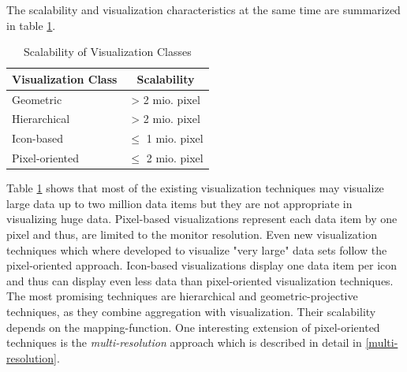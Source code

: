 
The scalability and visualization characteristics at the same time are summarized in table \ref{table:vizScalabilityOverview}. 

\begin{table}[H]
	\centering
	\caption[Scalability of Visualization Classes]{Scalability of Visualization Classes}
	\label{table:vizScalabilityOverview}
	\begin{tabular}{ l | c }
	\hline
	Visualization Class & Scalability\\
	\hline
	Geometric &  \cellcolor{green!25 } > 2 mio. pixel\\
	Hierarchical & \cellcolor{green!25} > 2 mio. pixel \\
	Icon-based & \cellcolor{red!25} $\leq$ 1 mio. pixel \\
	Pixel-oriented & \cellcolor{yellow!25} $\leq$ 2 mio. pixel \\	
	\hline
	\end{tabular}
\end{table}

Table \ref{table:vizScalabilityOverview} shows that most of the existing visualization techniques may visualize large data up to two million data items but they are not appropriate in visualizing huge data. Pixel-based visualizations represent each data item by one pixel and thus, are limited to the monitor resolution. Even new visualization techniques which where developed to visualize "very large" data sets follow the pixel-oriented approach. Icon-based visualizations display one data item per icon and thus can display even less data than pixel-oriented visualization techniques. The most promising techniques are hierarchical and geometric-projective techniques, as they combine aggregation with visualization. Their scalability depends on the mapping-function. 
One interesting extension of pixel-oriented techniques is the \textit{multi-resolution} approach  \cite{Keim2005} which is described in detail in \ref{multi-resolution}.







